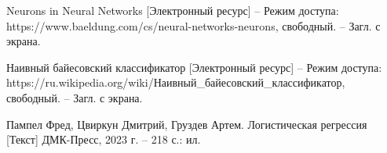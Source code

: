 \begin{references}
	\item\label{ref:neuron-model} Neurons in Neural Networks [Электронный ресурс] – Режим доступа: https://www.baeldung.com/cs/neural-networks-neurons, свободный. – Загл. с экрана.

	\item\label{ref:nbc} Наивный байесовский классификатор [Электронный ресурс] – Режим доступа: https://ru.wikipedia.org/wiki/Наивный\_байесовский\_классификатор, свободный. – Загл. с экрана.

	\item\label{ref:log-reg} Пампел Фред, Цвиркун Дмитрий, Груздев Артем. Логистическая регрессия [Текст] ДМК-Пресс, 2023 г. – 218 с.: ил.

	
	\label{ref:total}
\end{references}
